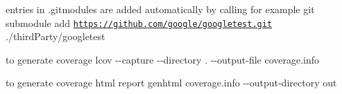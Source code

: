 \begin{DoxyItemize}
\item entries in {\ttfamily .gitmodules} are added automatically by calling for example {\ttfamily git submodule add \href{https://github.com/google/googletest.git}{\tt https\-://github.\-com/google/googletest.\-git} ./third\-Party/googletest}
\item to generate coverage {\ttfamily lcov -\/-\/capture -\/-\/directory . -\/-\/output-\/file coverage.\-info}
\item to generate coverage html report {\ttfamily genhtml coverage.\-info -\/-\/output-\/directory out} 
\end{DoxyItemize}